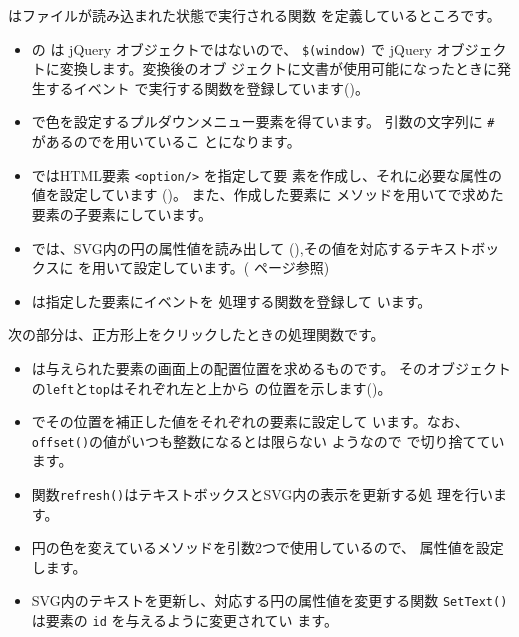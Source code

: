はファイルが読み込まれた状態で実行される関数
を定義しているところです。
\begin{itemize}\upshape
 \item {}の は jQuery オブジェクトではないので、
			 \verb+$(window)+ で jQuery オブジェクトに変換します。変換後のオブ
			 ジェクトに文書が使用可能になったときに発生するイベント
			 で実行する関数を登録しています()。
 \item {}で色を設定するプルダウンメニュー要素を得ています。
			 引数の文字列に \verb+#+ があるのでを用いているこ
			 とになります。
 \item {}ではHTML要素 \verb+<option/>+ を指定して要
			 素を作成し、それに必要な属性の値を設定しています
			 ()。 また、作成した要素に
			 メソッドを用いてで求めた
			 要素の子要素にしています。
 \item {}では、SVG内の円の属性値を読み出して
			 (),その値を対応するテキストボックスに
			  を用いて設定しています。(\pageref{jQueryMethod}
			 ページ参照)
 \item {}は指定した要素にイベントを
			 処理する関数を登録して
			 います。
\end{itemize}
次の部分は、正方形上をクリックしたときの処理関数です。
\begin{itemize}\upshape
 \item {}は与えられた要素の画面上の配置位置を求めるものです。
			 そのオブジェクトの\texttt{left}と\texttt{top}はそれぞれ左と上から
			 の位置を示します()。
 \item {}でその位置を補正した値をそれぞれの要素に設定して
			 います。なお、\texttt{offset()}の値がいつも整数になるとは限らない
			 ようなので で切り捨てています。
\end{itemize}
\begin{itemize}\upshape
 \item 関数\texttt{refresh()}はテキストボックスとSVG内の表示を更新する処
			 理を行います。
 \item 円の色を変えているメソッドを引数2つで使用しているので、
       属性値を設定します。
 \item SVG内のテキストを更新し、対応する円の属性値を変更する関数
			 \texttt{SetText()}は要素の \texttt{id} を与えるように変更されてい
			 ます。
\end{itemize}

